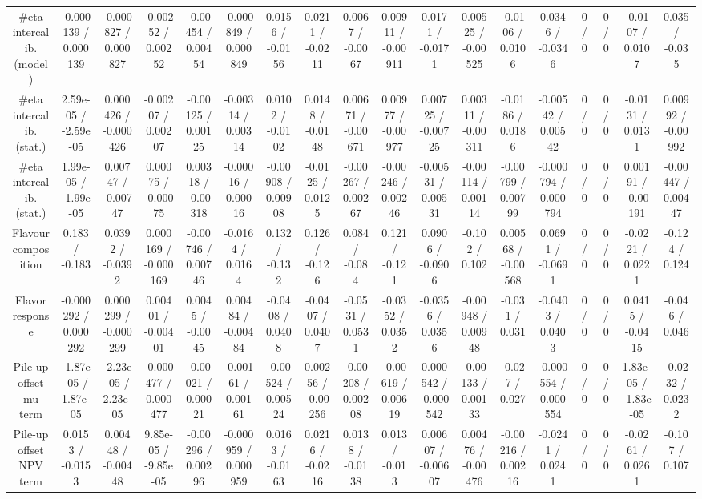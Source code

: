 \documentclass[10pt]{article}
\begin{document}
\begin{table}[htbp]
\begin{center}
\begin{tabular}{|c|c|c|c|c|c|c|c|c|c|c|c|c|c|c|c|c|c|}
  #eta intercalib. (model) & -0.000139 / 0.000139 & -0.000827 / 0.000827 & -0.00252 / 0.00252 & -0.00454 / 0.00454 & -0.000849 / 0.000849 & 0.0156 / -0.0156 & 0.0211 / -0.0211 & 0.0067 / -0.0067 & 0.00911 / -0.00911 & 0.0171 / -0.0171 & 0.00525 / -0.00525 & -0.0106 / 0.0106 & 0.0346 / -0.0346 & 0 / 0 & 0 / 0 & -0.0107 / 0.0107 & 0.035 / -0.035 \\ 
  #eta intercalib. (stat.) & 2.59e-05 / -2.59e-05 & 0.000426 / -0.000426 & -0.00207 / 0.00207 & -0.00125 / 0.00125 & -0.00314 / 0.00314 & 0.0102 / -0.0102 & 0.0148 / -0.0148 & 0.00671 / -0.00671 & 0.00977 / -0.00977 & 0.00725 / -0.00725 & 0.00311 / -0.00311 & -0.0186 / 0.0186 & -0.00542 / 0.00542 & 0 / 0 & 0 / 0 & -0.0131 / 0.0131 & 0.00992 / -0.00992 \\ 
  #eta intercalib. (stat.) & 1.99e-05 / -1.99e-05 & 0.00747 / -0.00747 & 0.00075 / -0.00075 & 0.00318 / -0.00318 & -0.00016 / 0.00016 & -0.00908 / 0.00908 & -0.0125 / 0.0125 & -0.00267 / 0.00267 & -0.00246 / 0.00246 & -0.00531 / 0.00531 & -0.00114 / 0.00114 & -0.00799 / 0.00799 & -0.000794 / 0.000794 & 0 / 0 & 0 / 0 & 0.00191 / -0.00191 & -0.00447 / 0.00447 \\ 
  Flavour composition & 0.183 / -0.183 & 0.0392 / -0.0392 & 0.000169 / -0.000169 & -0.00746 / 0.00746 & -0.0164 / 0.0164 & 0.132 / -0.132 & 0.126 / -0.126 & 0.084 / -0.084 & 0.121 / -0.121 & 0.0906 / -0.0906 & -0.102 / 0.102 & 0.00568 / -0.00568 & 0.0691 / -0.0691 & 0 / 0 & 0 / 0 & -0.0221 / 0.0221 & -0.124 / 0.124 \\ 
  Flavor response & -0.000292 / 0.000292 & 0.000299 / -0.000299 & 0.00401 / -0.00401 & 0.0045 / -0.0045 & 0.00484 / -0.00484 & -0.0408 / 0.0408 & -0.0407 / 0.0407 & -0.0531 / 0.0531 & -0.0352 / 0.0352 & -0.0356 / 0.0356 & -0.00948 / 0.00948 & -0.031 / 0.031 & -0.0403 / 0.0403 & 0 / 0 & 0 / 0 & 0.0415 / -0.0415 & -0.046 / 0.046 \\ 
  Pile-up offset mu term & -1.87e-05 / 1.87e-05 & -2.23e-05 / 2.23e-05 & -0.000477 / 0.000477 & -0.00021 / 0.00021 & -0.00161 / 0.00161 & -0.00524 / 0.00524 & 0.00256 / -0.00256 & -0.00208 / 0.00208 & -0.00619 / 0.00619 & 0.000542 / -0.000542 & -0.00133 / 0.00133 & -0.027 / 0.027 & -0.000554 / 0.000554 & 0 / 0 & 0 / 0 & 1.83e-05 / -1.83e-05 & -0.0232 / 0.0232 \\ 
  Pile-up offset NPV term & 0.0153 / -0.0153 & 0.00448 / -0.00448 & 9.85e-05 / -9.85e-05 & -0.00296 / 0.00296 & -0.000959 / 0.000959 & 0.0163 / -0.0163 & 0.0216 / -0.0216 & 0.0138 / -0.0138 & 0.013 / -0.013 & 0.00607 / -0.00607 & 0.00476 / -0.00476 & -0.00216 / 0.00216 & -0.0241 / 0.0241 & 0 / 0 & 0 / 0 & -0.0261 / 0.0261 & -0.107 / 0.107 \\ 

\end{tabular}
\end{center}
\end{table}
\end{document}
